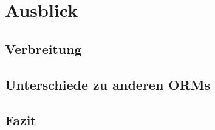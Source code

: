 \chapter{Ausblick}

\section{Verbreitung}

\section{Unterschiede zu anderen ORMs}

\section{Fazit}

